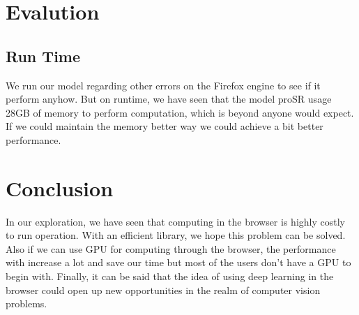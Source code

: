 \documentclass[a4paper,12pt]{article}
\begin{document}
\section{Evalution}
\subsection{Run Time}
We run our model regarding other errors on the Firefox engine to see if it perform anyhow. But on runtime, we have seen that the model proSR usage 28GB of memory to perform computation, which is beyond anyone would expect. If we could maintain the memory better way we could achieve a bit better performance.

\section{Conclusion}
 In our exploration, we have seen that computing in the browser is highly costly to run operation. With an efficient library, we hope this problem can be solved. Also if we can use GPU for computing through the browser, the performance with increase a lot and save our time but most of the users don't have a GPU to begin with. Finally, it can be said that the idea of using deep learning in the browser could open up new opportunities in the realm of computer vision problems. 




\end{document}

